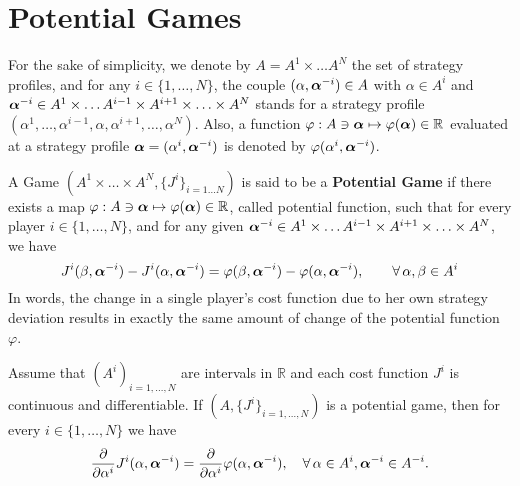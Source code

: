 \section{Potential Games }

For the sake of simplicity, we denote by $A = A^1 \times \ldots A^N$ the set of strategy profiles, and for any $i \in \{1,\ldots,N\}$, the couple $(\alpha, \boldsymbol{\alpha}^{-i}) \in A$ with $\alpha \in A^i$ and $\boldsymbol{\alpha}^{-i} \in A^{1} \times \ldots A^{i-1} \times A^{i+1} \times \ldots \times A^N$ stands for a strategy profile $(\alpha^1, \ldots, \alpha^{i-1}, \alpha, \alpha^{i+1}, \ldots, \alpha^N)$. Also, a function $\varphi : A \ni \boldsymbol{\alpha} \mapsto \varphi(\boldsymbol{\alpha}) \in \mathbb{R}$ evaluated at a strategy profile $\boldsymbol{\alpha} = (\alpha^i, \boldsymbol{\alpha}^{-i})$ is denoted by $\varphi(\alpha^i, \boldsymbol{\alpha}^{-i})$.

\begin{definition}
	A Game $(A^{1} \times \ldots \times A^{N}, \{J^{i}\}_{i=1\ldots N})$ is said to be a \textbf{Potential Game} if there exists a map $\varphi: A \ni \boldsymbol{\alpha} \mapsto \varphi(\boldsymbol{\alpha}) \in \mathbb{R}$, called potential function, such that for every player $i \in \{1, \ldots,N \}$, and for any given $\boldsymbol{\alpha}^{-i} \in  A^{1} \times \ldots A^{i-1} \times A^{i+1} \times \ldots \times A^N$, we have
	\begin{equation}
		 J^i(\beta, \boldsymbol{\alpha}^{-i}) - J^i(\alpha, \boldsymbol{\alpha}^{-i}) = \varphi( \beta, \boldsymbol{\alpha}^{-i} ) - \varphi(\alpha, \boldsymbol{\alpha}^{-i}) , \qquad \forall \, \alpha, \beta \in A^i
	\end{equation}
	In words, the change in a single player's cost function due to her own strategy deviation results in exactly the same amount of  change of the potential function $\varphi$.
\end{definition}

Assume that $(A^i)_{i=1,\ldots,N}$ are intervals in $\mathbb{R}$ and each cost function $J^i$ is continuous and differentiable. If $(A, \{J^i\}_{i=1,\ldots,N})$ is a potential game, then for every $i \in \{ 1,\ldots,N \}$ we have
$$
		\frac{\partial}{\partial \alpha^i} J^i(\alpha, \boldsymbol{\alpha}^{-i}) = \frac{\partial }{\partial \alpha^i} \varphi(\alpha, \boldsymbol{\alpha}^{-i}),  \quad \forall\, \alpha \in A^i, \boldsymbol{\alpha}^{-i} \in A^{-i}.
$$


